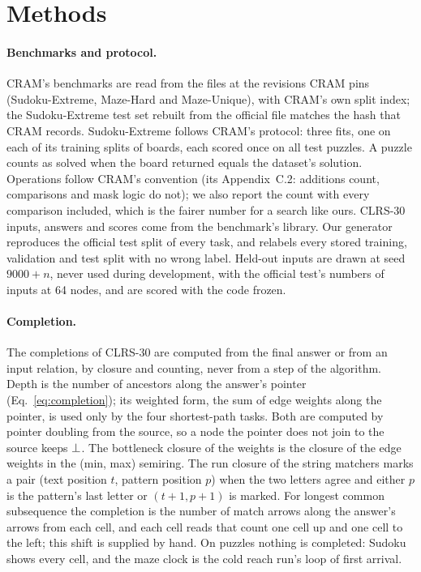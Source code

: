 \section*{Methods}

\paragraph{Benchmarks and protocol.} CRAM's benchmarks are read from the files at the revisions CRAM pins
(Sudoku-Extreme, Maze-Hard and Maze-Unique), with CRAM's own split index; the Sudoku-Extreme test set rebuilt from the
official file matches the hash that CRAM records. Sudoku-Extreme follows CRAM's protocol: three fits, one on each of its
training splits of  boards, each scored once on all  test puzzles. A puzzle
counts as solved when the board returned equals the dataset's solution. Operations follow CRAM's convention (its
Appendix~C.2: additions count, comparisons and mask logic do not); we also report the count with every comparison
included, which is the fairer number for a search like ours. CLRS-30 inputs, answers and scores come from the
benchmark's library\cite{velickovic2022clrs}. Our generator reproduces the official test split of every task, and
relabels every stored training, validation and test split with no wrong label. Held-out inputs are drawn at seed
$9000 + n$, never used during development, with the official test's numbers of inputs at 64 nodes, and are scored with
the code frozen.

\paragraph{Completion.} The completions of CLRS-30 are computed from the final answer or from an input relation, by
closure and counting, never from a step of the algorithm. Depth is the number of ancestors along the answer's pointer
(Eq.~\ref{eq:completion}); its weighted form, the sum of edge weights along the pointer, is used only by the four
shortest-path tasks. Both are computed by pointer doubling from the source, so a node the pointer does not join to
the source keeps $\bot$. The bottleneck closure of the weights is the closure of the edge weights in the (min, max) semiring. The run
closure of the string matchers marks a pair (text position $t$, pattern position $p$) when the two letters agree and
either $p$ is the pattern's last letter or $(t+1, p+1)$ is marked. For longest common subsequence the completion is the
number of match arrows along the answer's arrows from each cell, and each cell reads that count one cell up and one cell
to the left; this shift is supplied by hand. On puzzles nothing is completed: Sudoku shows every cell, and the maze
clock is the cold reach run's loop of first arrival.

